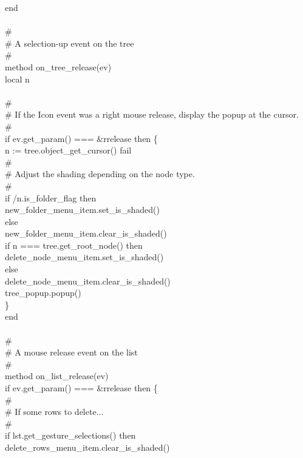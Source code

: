 {\>end \\
\ \\
\>\# \\
\>\# A selection-up event on the tree \\
\>\# \\
\>method on\_tree\_release(ev) \\
\>\>local n \\
\\
\>\>\# \\
\>\>\# If the Icon event was a right mouse release, display the popup at the cursor. \\
\>\>\# \\
\>\>if ev.get\_param() === \&rrelease then \{ \\
\>\>\>n := tree.object\_get\_cursor() {\textbar} fail \\
\>\>\>\# \\
\>\>\>\# Adjust the shading depending on the node type. \\
\>\>\>\# \\
\>\>\>if /n.is\_folder\_flag then \\
\>\>\>\>new\_folder\_menu\_item.set\_is\_shaded() \\
\>\>\>else \\
\>\>\>\>new\_folder\_menu\_item.clear\_is\_shaded() \\
\>\>\>if n === tree.get\_root\_node() then \\
\>\>\>\>delete\_node\_menu\_item.set\_is\_shaded() \\
\>\>\>else \\
\>\>\>\>delete\_node\_menu\_item.clear\_is\_shaded() \\
\>\>\>tree\_popup.popup() \\
\>\>\>\} \\
\>end \\
\ \\
\>\# \\
\>\# A mouse release event on the list \\
\>\# \\
\>method on\_list\_release(ev) \\
\>\>if ev.get\_param() === \&rrelease then \{ \\
\>\>\>\# \\
\>\>\>\# If some rows to delete... \\
\>\>\>\# \\
\>\>\>if lst.get\_gesture\_selections() then \\
\>\>\>\>delete\_rows\_menu\_item.clear\_is\_shaded() \\
}

